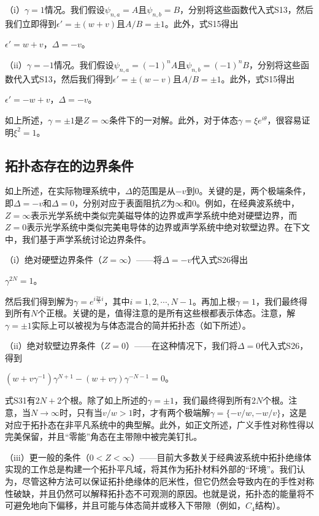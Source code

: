 （i）\(\gamma = 1\)情况。我们假设\(\psi_{n,a}=A\)且\(\psi_{n,b}=B\)，分别将这些函数代入式S13，然后我们立即得到\(\epsilon'=\pm(w + v)\)且\(A/B=\pm1\)。此外，式S15得出

\(\epsilon' = w + v\)，\(\Delta = -v\)。

（ii）\(\gamma = -1\)情况。我们假设\(\psi_{n,a}=(-1)^{n}A\)且\(\psi_{n,b}=(-1)^{n}B\)，分别将这些函数代入式S13，然后我们得到\(\epsilon'=\pm(w - v)\)且\(A/B=\pm1\)。此外，式S15得出

\(\epsilon' = -w + v\)，\(\Delta = -v\)。

如上所述，\(\gamma=\pm1\)是\(Z=\infty\)条件下的一对解。此外，对于体态\(\gamma=\xi e^{i\theta}\)，很容易证明\(\xi^{2}=1\)。

\subsection{拓扑态存在的边界条件}

如上所述，在实际物理系统中，\(\Delta\)的范围是从\(-v\)到\(0\)。关键的是，两个极端条件，即\(\Delta = -v\)和\(\Delta = 0\)，分别对应于表面阻抗\(Z\)为\(\infty\)和\(0\)。例如，在经典波系统中，\(Z=\infty\)表示光学系统中类似完美磁导体的边界或声学系统中绝对硬壁边界，而\(Z = 0\)表示光学系统中类似完美电导体的边界或声学系统中绝对软壁边界。在下文中，我们基于声学系统讨论边界条件。

（i）绝对硬壁边界条件（\(Z=\infty\)）——将\(\Delta = -v\)代入式S26得出

\(\gamma^{2N}=1\)。

然后我们得到解为\(\gamma = e^{i\frac{2\pi}{N}i}\)，其中\(i = 1,2,\cdots,N - 1\)。再加上根\(\gamma = 1\)，我们最终得到所有\(N\)个正根。关键的是，值得注意的是所有这些根都表示体态。注意，解\(\gamma=\pm1\)实际上可以被视为与体态混合的简并拓扑态（如下所述）。

（ii）绝对软壁边界条件（\(Z = 0\)）——在这种情况下，我们将\(\Delta = 0\)代入式S26，得到

\((w + v\gamma^{-1})\gamma^{N + 1}-(w + v\gamma)\gamma^{-N - 1}=0\)。

式S31有\(2N + 2\)个根。除了如上所述的\(\gamma=\pm1\)，我们最终得到所有\(2N\)个根。注意，当\(N\rightarrow\infty\)时，只有当\(v/w > 1\)时，才有两个极端解\(\gamma = \{-v/w, -w/v\}\)，这是对应于拓扑态在非平凡系统中的典型解。此外，如正文所述，广义手性对称性得以完美保留，并且“零能”角态在主带隙中被完美钉扎。

（iii）更一般的条件（\(0 < Z < \infty\)）——目前大多数关于经典波系统中拓扑绝缘体实现的工作总是构建一个拓扑平凡域，将其作为拓扑材料外部的“环境”。我们认为，尽管这种方法可以保证拓扑绝缘体的厄米性，但它仍然会导致内在的手性对称性破缺，并且仍然可以解释拓扑态不可观测的原因。也就是说，拓扑态的能量将不可避免地向下偏移，并且可能与体态简并或移入下带隙（例如，\(C_{4}\)结构）。

